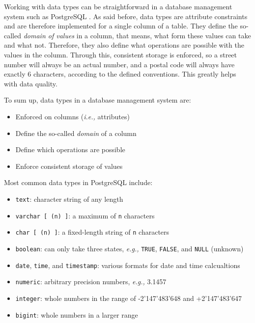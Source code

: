 \documentclass[11pt]{article}
\begin{document}
    Working with data types can be straightforward in a database management system such as PostgreSQL .
    As said before, data types are attribute constraints and are therefore implemented for a single column of a table.
    They define the so-called \textit{domain of values} in a column, that means, what form these values can take \textemdash and what not.
    Therefore, they also define what operations are possible with the values in the column.
    Through this, consistent storage is enforced, so a street number will always be an actual number, and a postal code will always have exactly 6 characters, according to the defined conventions.
    This greatly helps with data quality.

    To sum up, data types in a database management system are:

    \begin{itemize}
        \item Enforced on columns (\textit{i.e.,} attributes)
        \item Define the so-called \textit{domain} of a column
        \item Define which operations are possible
        \item Enforce consistent storage of values
    \end{itemize}

    Most common data types in PostgreSQL include:

    \begin{itemize}
        \item \texttt{text}: character string of any length
        \item \texttt{varchar [ (n) ]}: a maximum of \texttt{n} characters
        \item \texttt{char [ (n) ]}: a fixed-length string of \texttt{n} characters
        \item \texttt{boolean}: can only take three states, \textit{e.g.,} \texttt{TRUE}, \texttt{FALSE}, and \texttt{NULL} (unknown)
        \item \texttt{date}, \texttt{time}, and \texttt{timestamp}: various formats for date and time calcualtions
        \item \texttt{numeric}: arbitrary precision numbers, \textit{e.g.,} 3.1457
        \item \texttt{integer}: whole numbers in the range of -2'147'483'648 and +2'147'483'647
        \item \texttt{bigint}: whole numbers in a larger range
    \end{itemize}
\end{document}
